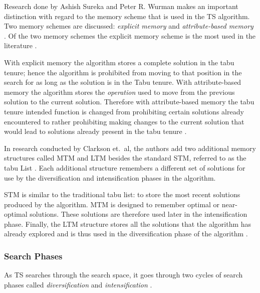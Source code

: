 Research done by Ashish Sureka and Peter R. Wurman makes an important distinction with regard to the memory scheme that is used in the \gls{TS} algorithm. Two memory schemes are discussed: \emph{explicit memory} and \emph{attribute-based memory} \cite{TabuBiddingStrats,TabuFormGames}. Of the two memory schemes the explicit memory scheme is the most used in the literature \cite{TabuVechicleRoutingWithTimeWindows}.

With explicit memory the algorithm stores a complete solution in the tabu tenure; hence the algorithm is prohibited from moving to that position in the search for as long as the solution is in the Tabu tenure\cite{TabuBiddingStrats,TabuFormGames}. With attribute-based memory the algorithm stores the \emph{operation} used to move from the previous solution to the current solution\cite{TabuBiddingStrats,TabuFormGames}. Therefore with attribute-based memory the tabu tenure intended function is changed from prohibiting certain solutions already encountered to rather prohibiting making changes to the current solution that would lead to solutions already present in the tabu tenure \cite{TabuBiddingStrats,TabuFormGames}.

In research conducted by Clarkson et.\ al\cite{MultiObjTabu}, the authors add two additional memory structures called \gls{MTM} and \gls{LTM} besides the standard \gls{STM}, referred to as the tabu List \cite{MultiObjTabu}. Each additional structure remembers a different set of solutions for use by the diversification and intensification phases in the algorithm.

STM is similar to the traditional tabu list: to store the most recent solutions produced by the algorithm. \gls{MTM} is designed to remember optimal or near-optimal solutions. These solutions are therefore used later in the intensification phase. Finally, the \gls{LTM} structure stores all the solutions that the algorithm has already explored and is thus used in the diversification phase of the algorithm \cite{MultiObjTabu}.

\subsubsection{Search Phases}
\label{TSSearchPhases}
As \gls{TS} searches through the search space, it goes through two cycles of search phases called \emph{diversification} and \emph{intensification} \cite{TabuParameterization,TabuCrewSchedulingProblem,NonlinearGlobalTabu,SelfControllingReactiveTabu}.

